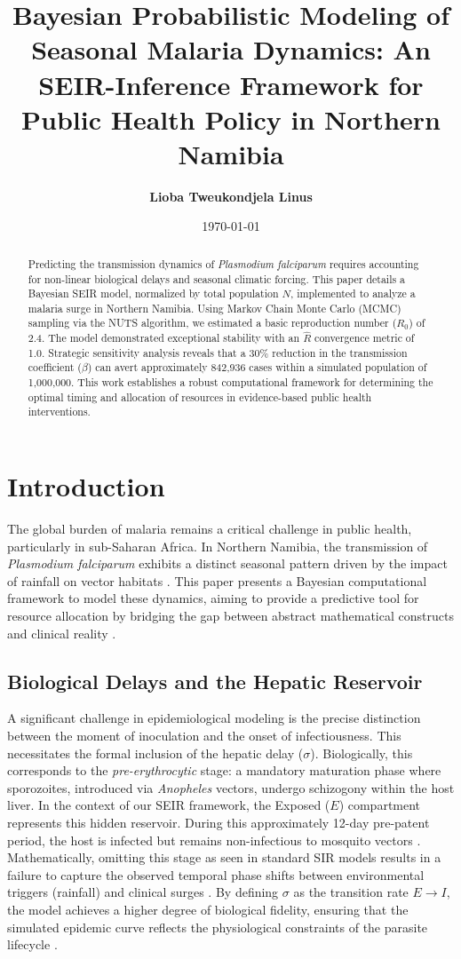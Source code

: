 \documentclass[12pt,a4paper]{report} %
\title{\Large \textbf{Bayesian Probabilistic Modeling of Seasonal Malaria Dynamics: An SEIR-Inference Framework for Public Health Policy in Northern Namibia}}
\author{\textbf{Lioba Tweukondjela Linus} }
\date{\today}
\begin{document}
\maketitle

\begin{abstract}
Predicting the transmission dynamics of \textit{Plasmodium falciparum} requires accounting for non-linear biological delays and seasonal climatic forcing. This paper details a Bayesian SEIR model, normalized by total population $N$, implemented to analyze a malaria surge in Northern Namibia. Using Markov Chain Monte Carlo (MCMC) sampling via the NUTS algorithm, we estimated a basic reproduction number ($R_0$) of 2.4. The model demonstrated exceptional stability with an $\hat{R}$ convergence metric of 1.0. Strategic sensitivity analysis reveals that a 30\% reduction in the transmission coefficient ($\beta$) can avert approximately 842,936 cases within a simulated population of 1,000,000. This work establishes a robust computational framework for determining the optimal timing and allocation of resources in evidence-based public health interventions.
\end{abstract}

\section{Introduction}
The global burden of malaria remains a critical challenge in public health, particularly in sub-Saharan Africa. In Northern Namibia, the transmission of \textit{Plasmodium falciparum} exhibits a distinct seasonal pattern driven by the impact of rainfall on vector habitats \cite{3, 9}. This paper presents a Bayesian computational framework to model these dynamics, aiming to provide a predictive tool for resource allocation by bridging the gap between abstract mathematical constructs and clinical reality \cite{1, 2}.
\subsection{Biological Delays and the Hepatic Reservoir}
A significant challenge in epidemiological modeling is the precise distinction between the moment of inoculation and the onset of infectiousness. This necessitates the formal inclusion of the hepatic delay ($\sigma$). Biologically, this corresponds to the \textit{pre-erythrocytic} stage: a mandatory maturation phase where sporozoites, introduced via \textit{Anopheles} vectors, undergo schizogony within the host liver. In the context of our SEIR framework, the Exposed ($E$) compartment represents this hidden reservoir. During this approximately 12-day pre-patent period, the host is infected but remains non-infectious to mosquito vectors \cite{1, 12}. Mathematically, omitting this stage as seen in standard SIR models results in a failure to capture the observed temporal phase shifts between environmental triggers (rainfall) and clinical surges \cite{3, 7}. By defining $\sigma$ as the transition rate $E \to I$, the model achieves a higher degree of biological fidelity, ensuring that the simulated epidemic curve reflects the physiological constraints of the parasite lifecycle \cite{11, 15}.
\end{document}
